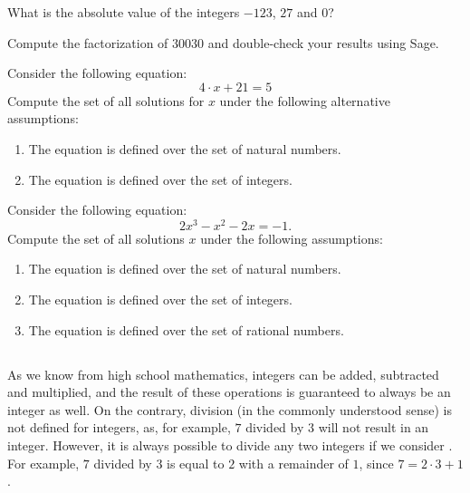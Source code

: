 \begin{exercise}
What is the absolute value of the integers $-123$, $27$ and $0$?
\end{exercise}
\begin{exercise}
Compute the factorization of $30030$ and double-check your results using  Sage.
\end{exercise}
\begin{exercise}
Consider the following equation:
\begin{equation*}4\cdot x + 21 = 5\end{equation*}
Compute the set of all solutions for $x$ under the following alternative assumptions:
\begin{enumerate}
\item The equation is defined over the set of natural numbers.
\item The equation is defined over the set of integers.
\end{enumerate}
\end{exercise}
\begin{exercise}
Consider the following equation:
\begin{equation*} 2 x^3 - x^2 - 2 x = - 1.\end{equation*}
Compute the set of all solutions $x$ under the following assumptions:
\begin{enumerate}
\item The equation is defined over the set of natural numbers.
\item The equation is defined over the set of integers.
\item The equation is defined over the set of rational numbers.
\end{enumerate}
\end{exercise}

\subsection{}
\label{Euclidean_division}
As we know from high school mathematics, integers can be added, subtracted and multiplied, and the result of these operations is guaranteed to always be an integer as well.
On the contrary, division (in the commonly understood sense) is not defined for integers, as, for example, $7$ divided by $3$ will not result in an integer. However, it is always possible to divide any two integers if we consider . For example, $7$ divided by $3$ is equal to $2$ with a remainder of $1$, since $7 = 2\cdot 3 + 1$.

